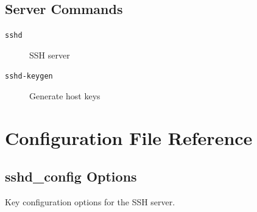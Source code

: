 \documentclass[12pt]{book}
\begin{document}
\section{Server Commands}

\begin{description}
    \item[\texttt{sshd}] SSH server
    \item[\texttt{sshd-keygen}] Generate host keys
\end{description}

\chapter{Configuration File Reference}

\section{sshd\_config Options}

Key configuration options for the SSH server.
\end{document}
